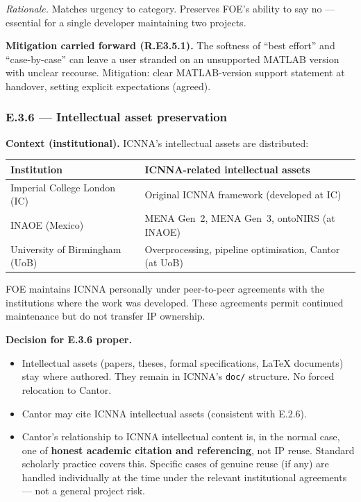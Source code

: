 \documentclass[11pt,a4paper]{article}
\begin{document}
\textit{Rationale.} Matches urgency to category. Preserves FOE's ability to say no --- essential for a single developer maintaining two projects.

\textbf{Mitigation carried forward (R.E3.5.1).} The softness of ``best effort'' and ``case-by-case'' can leave a user stranded on an unsupported MATLAB version with unclear recourse. Mitigation: clear MATLAB-version support statement at handover, setting explicit expectations (agreed).

\subsubsection{E.3.6 --- Intellectual asset preservation}

\textbf{Context (institutional).} ICNNA's intellectual assets are distributed:

\begin{table}[h]
\centering
\small
\begin{tabular}{ll}
\toprule
\textbf{Institution} & \textbf{ICNNA-related intellectual assets} \\
\midrule
Imperial College London (IC) & Original ICNNA framework (developed at IC) \\
INAOE (Mexico) & MENA Gen~2, MENA Gen~3, ontoNIRS (at INAOE) \\
University of Birmingham (UoB) & Overprocessing, pipeline optimisation, Cantor (at UoB) \\
\bottomrule
\end{tabular}
\end{table}

FOE maintains ICNNA personally under peer-to-peer agreements with the institutions where the work was developed. These agreements permit continued maintenance but do not transfer IP ownership.

\textbf{Decision for E.3.6 proper.}
\begin{itemize}
    \item Intellectual assets (papers, theses, formal specifications, LaTeX documents) stay where authored. They remain in ICNNA's \texttt{doc/} structure. No forced relocation to Cantor.
    \item Cantor may cite ICNNA intellectual assets (consistent with E.2.6).
    \item Cantor's relationship to ICNNA intellectual content is, in the normal case, one of \textbf{honest academic citation and referencing}, not IP reuse. Standard scholarly practice covers this. Specific cases of genuine reuse (if any) are handled individually at the time under the relevant institutional agreements --- not a general project risk.
\end{itemize}
\end{document}
